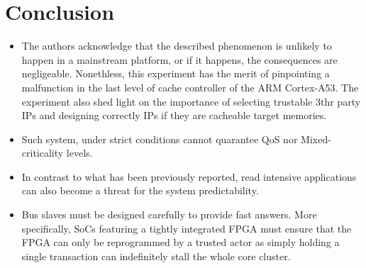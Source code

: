 \section{Conclusion}
    \begin{itemize}
        \item The authors acknowledge that the described phenomenon is unlikely to happen in a mainstream platform, or if it happens, the consequences are negligeable. Nonethless, this experiment has the merit of pinpointing a malfunction in the last level of cache controller of the ARM Cortex-A53. The experiment also shed light on the importance of selecting trustable 3thr party IPs and designing correctly IPs if they are cacheable target memories.
        \item Such system, under strict conditions cannot quarantee QoS nor Mixed-criticality levels.
        \item In contrast to what has been previously reported, read intensive applications can also become a threat for the system predictability.
        \item Bus slaves must be designed carefully to provide fast answers. More specifically, SoCs featuring a tightly integrated FPGA must ensure that the FPGA can only be reprogrammed by a trusted actor as simply holding a single transaction can indefinitely stall the whole core cluster.
    \end{itemize}
